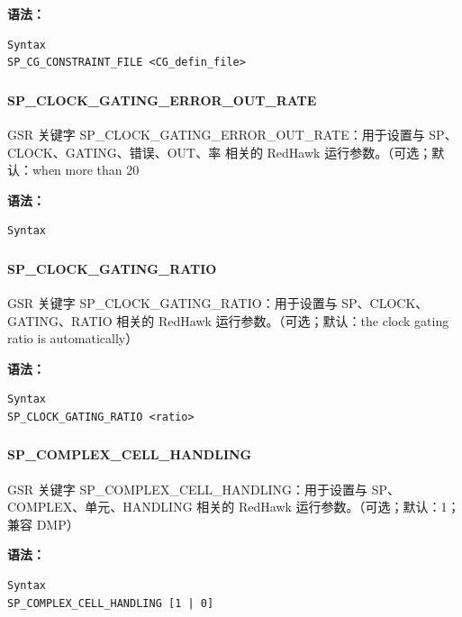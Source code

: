 \textbf{语法：}
\begin{lstlisting}
Syntax
SP_CG_CONSTRAINT_FILE <CG_defin_file>
\end{lstlisting}

\subsubsection{}
\paragraph*{SP_CLOCK_GATING_ERROR_OUT_RATE}

GSR 关键字 SP_CLOCK_GATING_ERROR_OUT_RATE：用于设置与 SP、CLOCK、GATING、错误、OUT、率 相关的 RedHawk 运行参数。（可选；默认：when more than 20%

\textbf{语法：}
\begin{lstlisting}
Syntax
\end{lstlisting}

\subsubsection{}
\paragraph*{SP_CLOCK_GATING_RATIO}

GSR 关键字 SP_CLOCK_GATING_RATIO：用于设置与 SP、CLOCK、GATING、RATIO 相关的 RedHawk 运行参数。（可选；默认：the clock gating ratio is automatically）

\textbf{语法：}
\begin{lstlisting}
Syntax
SP_CLOCK_GATING_RATIO <ratio>
\end{lstlisting}

\subsubsection{}
\paragraph*{SP_COMPLEX_CELL_HANDLING}

GSR 关键字 SP_COMPLEX_CELL_HANDLING：用于设置与 SP、COMPLEX、单元、HANDLING 相关的 RedHawk 运行参数。（可选；默认：1；兼容 DMP）

\textbf{语法：}
\begin{lstlisting}
Syntax
SP_COMPLEX_CELL_HANDLING [1 | 0]
\end{lstlisting}

